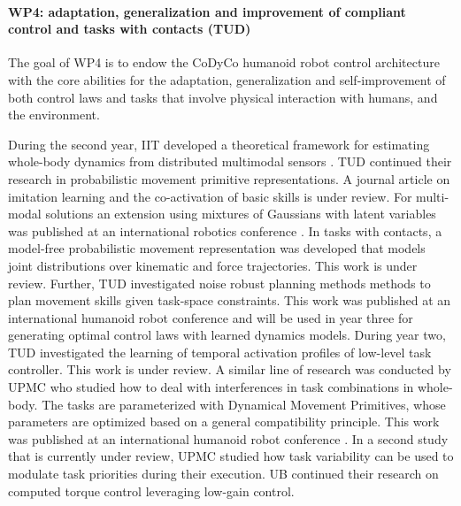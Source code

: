 

\paragraph*{WP4: adaptation, generalization and improvement of compliant control and tasks with contacts (TUD)}

The goal of WP4 is to endow the CoDyCo humanoid robot control architecture with
the core abilities for the adaptation, generalization and self-improvement of
both control laws and tasks that involve physical interaction with humans, and
the environment.

During the second year, IIT developed a theoretical framework for estimating whole-body
dynamics from distributed multimodal sensors \cite{Nori2015}.
TUD continued their research in probabilistic movement
primitive representations. A journal article on imitation learning and the
co-activation of basic skills is under review. For multi-modal solutions an
extension using mixtures of Gaussians with latent variables was published at an
international robotics conference \cite{Rueckert_2015}. In tasks with
contacts, a model-free probabilistic movement representation was developed that
models joint distributions over kinematic and force trajectories. This work is
under review. Further, TUD investigated noise robust planning methods methods to
plan movement skills given task-space constraints. This work was published at an
international humanoid robot conference \cite{Rueckert2014} and will be
used in year three for generating optimal control laws with learned dynamics
models. During year two, TUD investigated the learning of temporal activation
profiles of low-level task controller. This work is under review. 
A similar line of research was conducted by UPMC who studied how to deal with interferences in task combinations in whole-body.
The tasks are parameterized with Dynamical Movement Primitives, whose parameters are optimized
based on a general compatibility principle. This work was published at an 
international humanoid robot conference \cite{lober-HUMANOIDS2014}. 
In a second study that is currently under review, UPMC studied how task
variability can be used to modulate task priorities during their execution. 
UB continued their research on computed torque control leveraging low-gain control. 